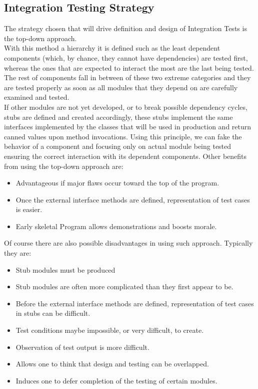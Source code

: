 \subsection{Integration Testing Strategy}
The strategy chosen that will drive definition and design of Integration Tests is the top-down approach. \\
With this method a hierarchy it is defined such as the least dependent components (which, by chance, they cannot have dependencies) are tested first, whereas the ones that are expected to interact the most are the last being tested. The rest of components fall in between of these two extreme categories and they are tested properly as soon as all modules that they depend on are carefully examined and tested. \\
If other modules are not yet developed, or to break possible dependency cycles, stubs are defined and created accordingly, these stubs implement the same interfaces implemented by the classes that will be used in production and return canned values upon method invocations. Using this principle, we can fake the behavior of a component and focusing only on actual module being tested ensuring the correct interaction with its dependent components.
Other benefits from using the top-down approach are:
\begin{itemize}
	\item Advantageous if major flaws occur toward the top of the program.
	\item Once the external interface methods are defined, representation of test cases is easier.
	\item Early skeletal Program allows demonstrations and boosts morale.
\end{itemize}
Of course there are also possible disadvantages in using such approach. Typically they are:
\begin{itemize}
	\item Stub modules must be produced
	\item Stub modules are often more complicated than they first appear to be.
	\item Before the external interface methods are defined, representation of test cases in stubs can be difficult.
	\item Test conditions maybe impossible, or very difficult, to create.
	\item Observation of test output is more difficult.
	\item Allows one to think that design and testing can be overlapped.
	\item Induces one to defer completion of the testing of certain modules.
\end{itemize}
